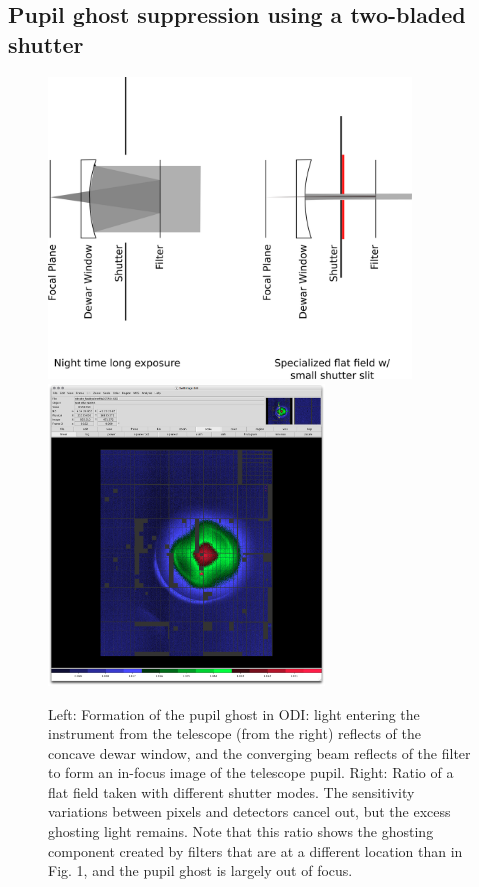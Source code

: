 \documentclass[draft]{spieman}
\begin{document}
\subsection{Pupil ghost suppression using a two-bladed shutter}

\begin{figure}[h]
    \includegraphics[height=8cm]{images/odishutterpupilghostsupression.png}
    \hspace{0.5cm} \includegraphics[height=8cm]{images/odi_layeronepg.png}
    \caption{ \label{fig_pupilghost}Left: Formation of the pupil ghost in ODI:  light 
        entering the instrument from the telescope (from the right) reflects of the
        concave dewar window, and the converging beam reflects of the filter to
        form an in-focus image of the telescope pupil. Right: Ratio of a flat
        field taken with different shutter modes. The sensitivity variations between
        pixels and detectors cancel out, but the excess ghosting light remains. Note
        that this ratio shows the ghosting component created by filters that are at
        a different location than in Fig. 1, and the pupil ghost is largely out of
        focus.} \end{figure}
\end{document}
